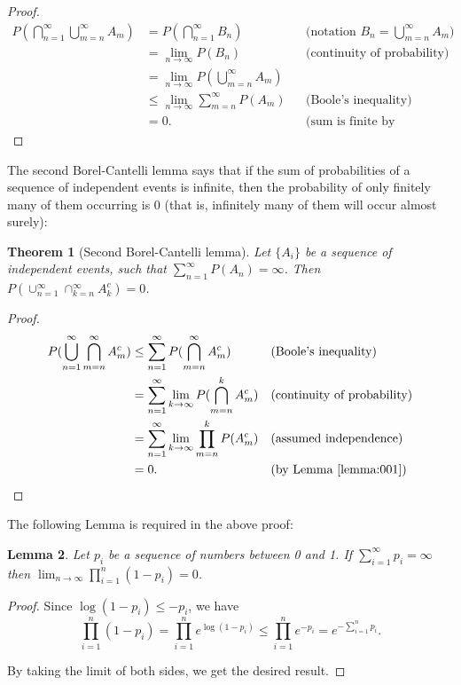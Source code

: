\documentclass{book}
\theoremstyle{plain}%
\newtheorem{theorem}{Theorem}[section]
\newtheorem{lemma}[theorem]{Lemma}
\theoremstyle{definition}
\newlength{\arrow}
\begin{document}
\begin{proof}
\begin{align*}
    P(\bigcap_{n=1}^\infty \bigcup_{m=n}^\infty A_m) &= P(\bigcap_{n=1}^\infty  B_n) && \text{(notation $B_n = \bigcup_{m=n}^\infty A_m$)}\\
    &= \lim_{n \rightarrow \infty} P(B_n)&& \text{(continuity of probability)}\\
    &=\lim_{n \rightarrow \infty} P(\bigcup_{m=n}^\infty A_m)\\
    &\leq \lim_{n \rightarrow \infty} \sum_{m=n}^\infty P(A_m) && \text{(Boole's inequality)} \\
    &=0. && \text{(sum is finite by assumption)}
\end{align*}
\end{proof}

The second Borel-Cantelli lemma says that if the sum of probabilities of a sequence of independent events is infinite, then the probability of only finitely many of them occurring is 0 (that is, infinitely many of them will occur almost surely):

\begin{theorem}[Second Borel-Cantelli lemma] Let $\{A_i\}$ be a sequence of independent events, such that $\sum_{n=1}^\infty P(A_n) = \infty$. Then $P(\cup_{n=1}^\infty \cap_{k = n}^\infty A_k^c) = 0$.
\end{theorem}


\begin{proof}
\begin{align*}
    P(\bigcup_{n=1}^\infty \bigcap_{m=n}^\infty A^c_m) &\leq \sum_{n=1}^\infty P(\bigcap_{m=n}^\infty  A^c_m) && \text{(Boole's inequality)}\\
    &= \sum_{n=1}^\infty \lim_{k \rightarrow \infty} P(\bigcap_{m=n}^k  A^c_m) && \text{(continuity of probability)}\\
    &= \sum_{n=1}^\infty \lim_{k \rightarrow \infty} \prod_{m=n}^k P( A^c_m) && \text{(assumed independence)}\\
    &=0. && \text{(by Lemma \ref{lemma:001})}
\end{align*}
\end{proof}

The following Lemma is required in the above proof:

\begin{lemma}
Let $p_i$ be a sequence of numbers between 0 and 1. If $\sum_{i=1}^\infty p_i = \infty$ then $\lim_{n \rightarrow \infty} \prod_{i=1}^n (1 - p_i) = 0$.\label{lemma:001}
\end{lemma}
\begin{proof}
Since $\log (1 - p_i) \leq -p_i$, we have $$\prod_{i=1}^n (1-p_i) = \prod_{i=1}^n e^{\log(1-p_i)} \leq \prod_{i=1}^n e^{-p_i} = e^{-\sum_{i=1}^n p_i}.$$

By taking the limit of both sides, we get the desired result.
\end{proof}
\end{document}
